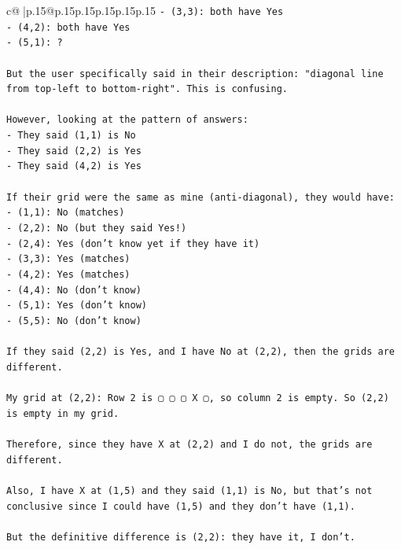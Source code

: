 \documentclass{article}
\begin{document}
{\begin{supertabular}{c@{$\;$}|p{.15\linewidth}@{}p{.15\linewidth}p{.15\linewidth}p{.15\linewidth}p{.15\linewidth}p{.15\linewidth}}
{{{\texttt{{-} (3,3): both have Yes} \\
\texttt{{-} (4,2): both have Yes} \\
\texttt{{-} (5,1): ?} \\
\\ 
\texttt{But the user specifically said in their description: "diagonal line from top{-}left to bottom{-}right". This is confusing.} \\
\\ 
\texttt{However, looking at the pattern of answers:} \\
\texttt{{-} They said (1,1) is No} \\
\texttt{{-} They said (2,2) is Yes} \\
\texttt{{-} They said (4,2) is Yes} \\
\\ 
\texttt{If their grid were the same as mine (anti{-}diagonal), they would have:} \\
\texttt{{-} (1,1): No (matches)} \\
\texttt{{-} (2,2): No (but they said Yes!)} \\
\texttt{{-} (2,4): Yes (don't know yet if they have it)} \\
\texttt{{-} (3,3): Yes (matches)} \\
\texttt{{-} (4,2): Yes (matches)} \\
\texttt{{-} (4,4): No (don't know)} \\
\texttt{{-} (5,1): Yes (don't know)} \\
\texttt{{-} (5,5): No (don't know)} \\
\\ 
\texttt{If they said (2,2) is Yes, and I have No at (2,2), then the grids are different.} \\
\\ 
\texttt{My grid at (2,2): Row 2 is ▢ ▢ ▢ X ▢, so column 2 is empty. So (2,2) is empty in my grid.} \\
\\ 
\texttt{Therefore, since they have X at (2,2) and I do not, the grids are different.} \\
\\ 
\texttt{Also, I have X at (1,5) and they said (1,1) is No, but that's not conclusive since I could have (1,5) and they don't have (1,1).} \\
\\ 
\texttt{But the definitive difference is (2,2): they have it, I don't.} \\
\\ 
}}}
\end{supertabular}}
\end{document}
